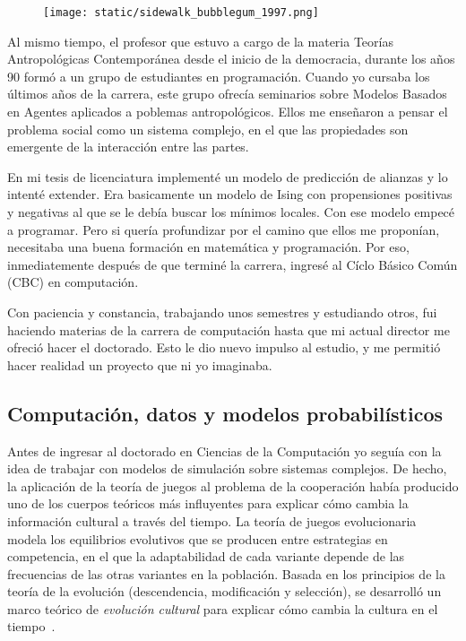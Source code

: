 \documentclass[a4paper,11pt]{book}
\theoremstyle{definition}
\begin{document}
\begin{figure}[ht!]
\centering
\texttt{[image: static/sidewalk\_bubblegum\_1997.png]}
\caption{}
\label{fig:sidewalk_bubblegum_1997}
\end{figure}


Al mismo tiempo, el profesor que estuvo a cargo de la materia Teorías Antropológicas Contemporánea desde el inicio de la democracia, durante los años 90 formó a un grupo de estudiantes en programación.
%
Cuando yo cursaba los últimos años de la carrera, este grupo ofrecía seminarios sobre Modelos Basados en Agentes aplicados a poblemas antropológicos.
%
Ellos me enseñaron a pensar el problema social como un sistema complejo, en el que las propiedades son emergente de la interacción entre las partes.

%

En mi tesis de licenciatura implementé un modelo de predicción de alianzas y lo intenté extender.
%
Era basicamente un modelo de Ising con propensiones positivas y negativas al que se le debía buscar los mínimos locales.
%
Con ese modelo empecé a programar.
%
Pero si quería profundizar por el camino que ellos me proponían, necesitaba una buena formación en matemática y programación.
%
Por eso, inmediatemente después de que terminé la carrera, ingresé al Cíclo Básico Común (CBC) en computación.


Con paciencia y constancia, trabajando unos semestres y estudiando otros, fui haciendo materias de la carrera de computación hasta que mi actual director me ofreció hacer el doctorado.
%
Esto le dio nuevo impulso al estudio, y me permitió hacer realidad un proyecto que ni yo imaginaba.


\subsection{Computación, datos y modelos probabilísticos}

Antes de ingresar al doctorado en Ciencias de la Computación yo seguía con la idea de trabajar con modelos de simulación sobre sistemas complejos.
%
De hecho, la aplicación de la teoría de juegos al problema de la cooperación había producido uno de los cuerpos teóricos más influyentes  para explicar cómo cambia la información cultural a través del tiempo.
%
La teoría de juegos evolucionaria \cite{taylor1978-replicatorDynamic, maynardSmith1982-evolutionGameTheory} modela los equilibrios evolutivos que se producen entre estrategias en competencia, en el que la adaptabilidad de cada variante depende de las frecuencias de las otras variantes en la población.
%
Basada en los principios de la teoría de la evolución (descendencia, modificación y selección), se desarrolló un marco teórico de \emph{evolución cultural} para explicar cómo cambia la cultura en el tiempo~\cite{boyd1985-evolutionaryProcess, boyd2005-origin}.
\end{document}
